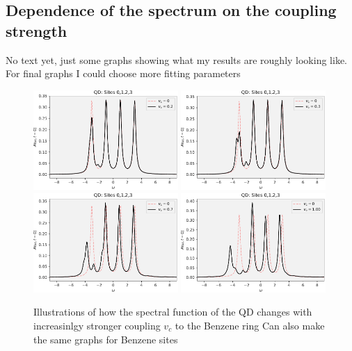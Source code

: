 \subsection{Dependence of the spectrum on the coupling strength}
\color{red}
No text yet, just some graphs showing what my results are roughly looking like. For final graphs I could choose more fitting parameters
\color{black}

\begin{figure}[!hbt]
    \centering
    \includegraphics[width=0.49\textwidth]{graph/spectrum_vc_sweep/QD_All_020.pdf}
    \includegraphics[width=0.49\textwidth]{graph/spectrum_vc_sweep/QD_All_030.pdf}
    \includegraphics[width=0.49\textwidth]{graph/spectrum_vc_sweep/QD_All_070.pdf}
    \includegraphics[width=0.49\textwidth]{graph/spectrum_vc_sweep/QD_All_100.pdf}
    \caption{Illustrations of how the spectral function of the QD changes with increasinlgy stronger coupling $v_c$ to the Benzene ring {\color{red} Can also make the same graphs for Benzene sites}}
    \label{fig:spectrum_vc_sweep}
\end{figure}


